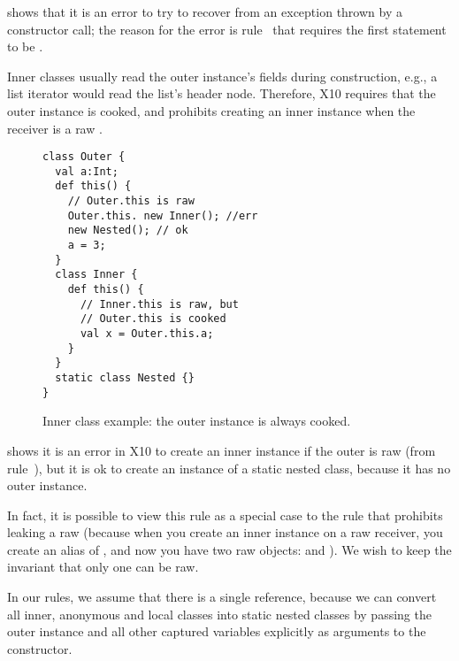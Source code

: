  shows that it is an error to try to recover from an exception thrown
    by a constructor call;
    the reason for the error is rule~ that requires the first statement to be .


Inner classes usually read the outer instance's fields during construction,
    e.g., a list iterator would read the list's header node.
Therefore, X10 requires that the outer instance is cooked,
    and prohibits creating an inner instance when the receiver is a raw \this.


\begin{figure}
\vspace{-0.2cm}\begin{lstlisting}
class Outer {
  val a:Int;
  def this() {
    // Outer.this is raw
    Outer.this. new Inner(); //err
    new Nested(); // ok
    a = 3;
  }
  class Inner {
    def this() {
      // Inner.this is raw, but
      // Outer.this is cooked
      val x = Outer.this.a;
    }
  }
  static class Nested {}
}
\end{lstlisting}\vspace{-0.2cm}
\caption{Inner class example: the outer instance is always cooked.
    }
\label{Figure:InnerClass}
\end{figure}

 shows it is an error in X10 to create an inner instance
    if the outer is raw (from rule~),
    but it is ok to create an instance of a static nested class,
    because it has no outer instance.

In fact, it is possible to view this rule as a special case to the rule that
    prohibits leaking a raw \this
    (because when you create an inner instance on a raw \this receiver,
    you create an alias of \this,
    and now you have two raw objects:  and ).
We wish to keep the invariant that only one \this can be raw.

In our rules, we assume that there is a single \this reference,
    because we can convert all inner, anonymous and local classes into
    static nested classes
    by passing the outer instance and all other captured variables
    explicitly as arguments to the constructor.






